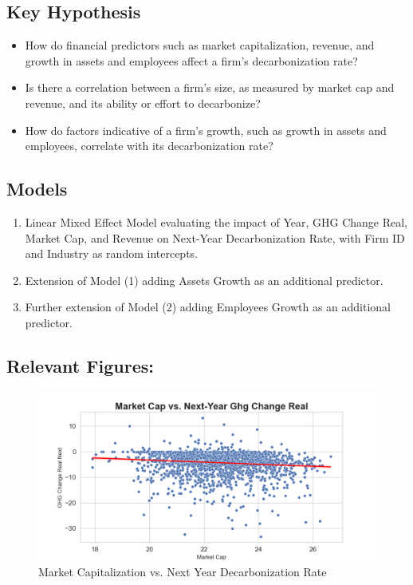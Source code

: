 \subsection{Key Hypothesis}
\begin{itemize}
    \item How do financial predictors such as market capitalization, revenue, and growth in assets and employees affect a firm's decarbonization rate?
    \item Is there a correlation between a firm's size, as measured by market cap and revenue, and its ability or effort to decarbonize?
    \item How do factors indicative of a firm's growth, such as growth in assets and employees, correlate with its decarbonization rate?
\end{itemize}

\subsection{Models} 
\begin{enumerate}
    \item Linear Mixed Effect Model evaluating the impact of Year, GHG Change Real, Market Cap, and Revenue on Next-Year Decarbonization Rate, with Firm ID and Industry as random intercepts.
    \item Extension of Model (1) adding Assets Growth as an additional predictor.
    \item Further extension of Model (2) adding Employees Growth as an additional predictor.
\end{enumerate}



\subsection{Relevant Figures:}
\begin{figure}[H]
\centering
  \includegraphics[width=\textwidth]{figures/market_cap_vs_ghg_change_real_next.png}
\caption{Market Capitalization vs. Next Year Decarbonization Rate}
\label{fig:market_cap_vs_ghg_change_real_next}
\end{figure}

